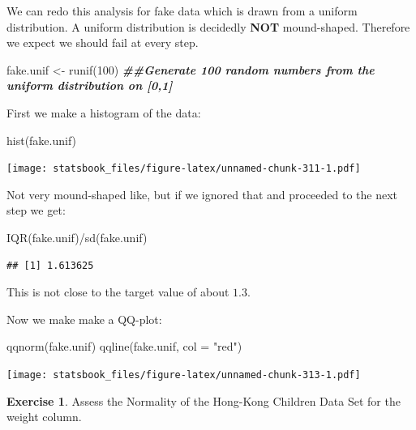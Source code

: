 \documentclass[
]{book}
\newenvironment{Shaded}{\begin{snugshade}}{\end{snugshade}}
\newcommand{\AttributeTok}[1]{\textcolor[rgb]{0.77,0.63,0.00}{#1}}
\newcommand{\DecValTok}[1]{\textcolor[rgb]{0.00,0.00,0.81}{#1}}
\newcommand{\DocumentationTok}[1]{\textcolor[rgb]{0.56,0.35,0.01}{\textbf{\textit{#1}}}}
\newcommand{\FunctionTok}[1]{\textcolor[rgb]{0.00,0.00,0.00}{#1}}
\newcommand{\NormalTok}[1]{#1}
\newcommand{\OtherTok}[1]{\textcolor[rgb]{0.56,0.35,0.01}{#1}}
\newcommand{\SpecialCharTok}[1]{\textcolor[rgb]{0.00,0.00,0.00}{#1}}
\newcommand{\StringTok}[1]{\textcolor[rgb]{0.31,0.60,0.02}{#1}}
\theoremstyle{definition}
\theoremstyle{definition}
\theoremstyle{definition}
\newtheorem{exercise}{Exercise}[chapter]
\theoremstyle{definition}
\theoremstyle{remark}
\begin{document}
We can redo this analysis for fake data which is drawn from a uniform distribution. A uniform distribution is decidedly \textbf{NOT} mound-shaped. Therefore we expect we should fail at every step.

\begin{Shaded}
\begin{Highlighting}[]
\NormalTok{fake.unif }\OtherTok{\textless{}{-}} \FunctionTok{runif}\NormalTok{(}\DecValTok{100}\NormalTok{)  }\DocumentationTok{\#\#Generate 100 random numbers from the uniform distribution on [0,1]}
\end{Highlighting}
\end{Shaded}

First we make a histogram of the data:

\begin{Shaded}
\begin{Highlighting}[]
\FunctionTok{hist}\NormalTok{(fake.unif)}
\end{Highlighting}
\end{Shaded}

\texttt{[image: statsbook\_files/figure-latex/unnamed-chunk-311-1.pdf]}

Not very mound-shaped like, but if we ignored that and proceeded to the next step we get:

\begin{Shaded}
\begin{Highlighting}[]
\FunctionTok{IQR}\NormalTok{(fake.unif)}\SpecialCharTok{/}\FunctionTok{sd}\NormalTok{(fake.unif)}
\end{Highlighting}
\end{Shaded}

\begin{verbatim}
## [1] 1.613625
\end{verbatim}

This is not close to the target value of about \(1.3\).

Now we make make a QQ-plot:

\begin{Shaded}
\begin{Highlighting}[]
\FunctionTok{qqnorm}\NormalTok{(fake.unif)}
\FunctionTok{qqline}\NormalTok{(fake.unif, }\AttributeTok{col =} \StringTok{"red"}\NormalTok{)}
\end{Highlighting}
\end{Shaded}

\texttt{[image: statsbook\_files/figure-latex/unnamed-chunk-313-1.pdf]}

\begin{exercise}
\protect\hypertarget{exr:unnamed-chunk-314}{}\label{exr:unnamed-chunk-314}Assess the Normality of the Hong-Kong Children Data Set for the weight column.
\end{exercise}
\end{document}
